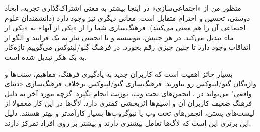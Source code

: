 
منظور من از «اجتماعی‌سازی» در اینجا بیشتر به معنی اشتراک‌گذاری تجربه،
ایجاد دوستی، تحسین و احترام متقابل است. معانی دیگری نیز وجود دارد
(دانشمندان علوم اجتماعی آن را
هم معنی می‌کنند).
فرهنگ‌سازی شما را از «یکی از آنها» به «یکی از ما» تبدیل می‌کند.
در هر جنبش، موسسه و یا انجمنی نیاز به یک فرایند و الگو از اتفاقات وجود دارد
تا چنین چیزی رقم بخورد. در فرهنگ گنو/لینوکس می‌گوییم تازه‌کار به یک هکر تبدیل شده است.


بسیار حائز اهمیت است که کاربران جدید به یادگیری فرهنگ، مفاهیم، سنت‌ها
و واژه‌گان گنو/لینوکس رو بیاورند. فرهنگ‌سازی گنو/لینوکس برخلاف فرهنگ‌سازی «دنیای واقعی"
می‌تواند در
،
انجمن‌های تحت وب، یوزنت انجام بگیرد. گرچه مورد آخر به دلیل فرهنگ ضعیف کاربران آن
و اسپم‌ها اثربخشی کمتری دارد.
لاگ‌ها در این کار معمولا از لیست‌های پستی، انجمن‌های تحت وب یا نیوگروپ‌ها بسیار کارآمدتر
و بهتر هستند. دلیل این برتری این است که لاگ‌ها تعامل بیشتری دارند و بیشتر بر روی
افراد تمرکز دارند.

